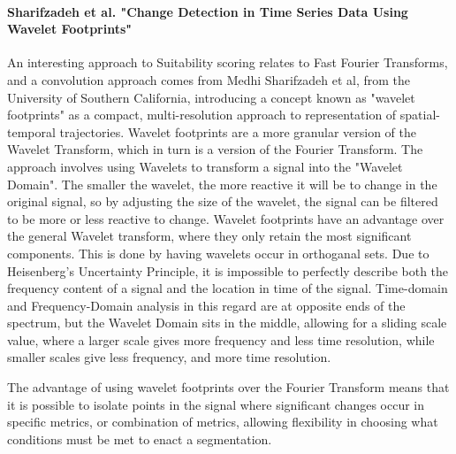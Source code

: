 \documentclass[11pt,twoside]{report}
\begin{document}
\paragraph{Sharifzadeh et al. "Change Detection in Time Series Data Using Wavelet \citep{Sharifzadeh2005} Footprints"}
An interesting approach to Suitability scoring relates to Fast Fourier Transforms, and a convolution approach comes from Medhi Sharifzadeh et al, from the University of Southern California, introducing a concept known as
"wavelet footprints" as a compact, multi-resolution approach to representation of spatial-temporal trajectories. Wavelet footprints are a  more granular version of the Wavelet Transform, which in turn is a version of the Fourier Transform. The approach involves using Wavelets to transform a signal into the "Wavelet Domain".
The smaller the wavelet, the more reactive it will be to change in the original signal, so by adjusting the size of the wavelet, the signal can be filtered to be more or less reactive to change.
Wavelet footprints have an advantage over the general Wavelet transform, where they only retain the most significant components. This is done by having wavelets occur in orthoganal sets.
Due to Heisenberg's Uncertainty Principle, it is impossible to perfectly describe both the frequency content of a signal and the location in time of the signal. Time-domain and Frequency-Domain analysis in this regard are
at opposite ends of the spectrum, but the Wavelet Domain sits in the middle, allowing for a sliding scale value, where a larger scale gives more frequency and less time resolution, while smaller scales give less frequency, and more time resolution.

The advantage of using wavelet footprints over the Fourier Transform means that it is possible to isolate points in the signal where significant changes occur in specific metrics, or combination of metrics, allowing flexibility in choosing
what conditions must be met to enact a segmentation.
\end{document}
